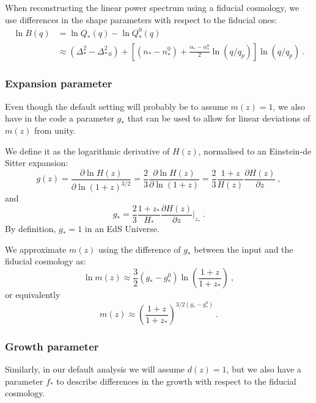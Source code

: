 When reconstructing the linear power spectrum using a fiducial cosmology,
we use differences in the shape parameters with respect to the fiducial ones:
\begin{align}
 \ln B(q) & = \ln Q_\ast(q) - \ln Q^0_\ast(q)       \nonumber \\
  & \approx \left( \Delta^2_\ast - \Delta^2_{\ast~0} \right)
    + \left[ \left( n_\ast - n^0_\ast \right) 
    + \frac{\alpha_\ast - \alpha^0_\ast}{2} \ln (q/q_p) \right] \ln (q/q_p)~.
\end{align}


\subsubsection{Expansion parameter}

Even though the default setting will probably be to assume $m(z)=1$, we
also have in the code a parameter $g_\ast$ that can be used to allow for
linear deviations of $m(z)$ from unity.

We define it as the logarithmic derivative of $H(z)$, normalised to an
Einstein-de Sitter expansion:
\begin{equation}
 g(z) = \frac{\partial \ln H(z)}{\partial \ln (1+z)^{3/2}} 
  = \frac{2}{3} \frac{\partial \ln H(z)}{\partial \ln(1+z)} 
  = \frac{2}{3} \frac{1+z}{H(z)} \frac{\partial H(z)}{\partial z} ~,
\end{equation}
and 
\begin{equation}
 g_\ast = \frac{2}{3} \frac{1+z_\ast}{H_\ast} 
      \frac{\partial H(z)}{\partial z} \Bigr\rvert_{z_\ast} ~.
\end{equation}
By definition, $g_\ast=1$ in an EdS Universe.

We approximate $m(z)$ using the difference of $g_\ast$ between the input
and the fiducial cosmology as:
\begin{equation}
 \ln m(z) \approx \frac{3}{2} \left( g_\ast - g^0_\ast \right) 
    \ln \left( \frac{1+z}{1+z_\ast} \right) ~,
\end{equation}
or equivalently
\begin{equation}
 m(z) \approx \left( \frac{1+z}{1+z_\ast} \right)^{3/2 ( g_\ast - g^0_\ast)} ~.
\end{equation}


\subsubsection{Growth parameter}

Similarly, in our default analysis we will assume $d(z)=1$, but we also
have a parameter $f_\ast$ to describe differences in the growth with respect
to the fiducial cosmology.

